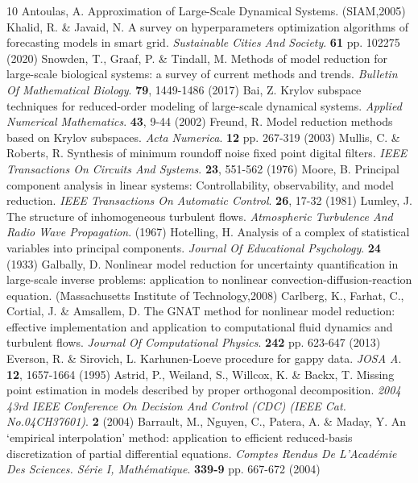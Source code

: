 \documentclass{article}
\begin{document}
\begin{thebibliography}{10}
Antoulas, A. Approximation of Large-Scale Dynamical Systems. (SIAM,2005)
Khalid, R. \& Javaid, N. A survey on hyperparameters optimization algorithms of forecasting models in smart grid. {\em Sustainable Cities And Society}. \textbf{61} pp. 102275 (2020)
Snowden, T., Graaf, P. \& Tindall, M. Methods of model reduction for large-scale biological systems: a survey of current methods and trends. {\em Bulletin Of Mathematical Biology}. \textbf{79}, 1449-1486 (2017)
Bai, Z. Krylov subspace techniques for reduced-order modeling of large-scale dynamical systems. {\em Applied Numerical Mathematics}. \textbf{43}, 9-44 (2002)
Freund, R. Model reduction methods based on Krylov subspaces. {\em Acta Numerica}. \textbf{12} pp. 267-319 (2003)
Mullis, C. \& Roberts, R. Synthesis of minimum roundoff noise fixed point digital filters. {\em IEEE Transactions On Circuits And Systems}. \textbf{23}, 551-562 (1976)
Moore, B. Principal component analysis in linear systems: Controllability, observability, and model reduction. {\em IEEE Transactions On Automatic Control}. \textbf{26}, 17-32 (1981)
Lumley, J. The structure of inhomogeneous turbulent flows. {\em Atmospheric Turbulence And Radio Wave Propagation}. (1967)
Hotelling, H. Analysis of a complex of statistical variables into principal components. {\em Journal Of Educational Psychology}. \textbf{24} (1933)
Galbally, D. Nonlinear model reduction for uncertainty quantification in large-scale inverse problems: application to nonlinear convection-diffusion-reaction equation. (Massachusetts Institute of Technology,2008)
Carlberg, K., Farhat, C., Cortial, J. \& Amsallem, D. The GNAT method for nonlinear model reduction: effective implementation and application to computational fluid dynamics and turbulent flows. {\em Journal Of Computational Physics}. \textbf{242} pp. 623-647 (2013)
Everson, R. \& Sirovich, L. Karhunen-Loeve procedure for gappy data. {\em JOSA A}. \textbf{12}, 1657-1664 (1995)
Astrid, P., Weiland, S., Willcox, K. \& Backx, T. Missing point estimation in models described by proper orthogonal decomposition. {\em 2004 43rd IEEE Conference On Decision And Control (CDC) (IEEE Cat. No.04CH37601)}. \textbf{2} (2004)
Barrault, M., Nguyen, C., Patera, A. \& Maday, Y. An `empirical interpolation' method: application to efficient reduced-basis discretization of partial differential equations. {\em Comptes Rendus De L'Académie Des Sciences. Série I, Mathématique}. \textbf{339-9} pp. 667-672 (2004)

\end{thebibliography}
\end{document}
